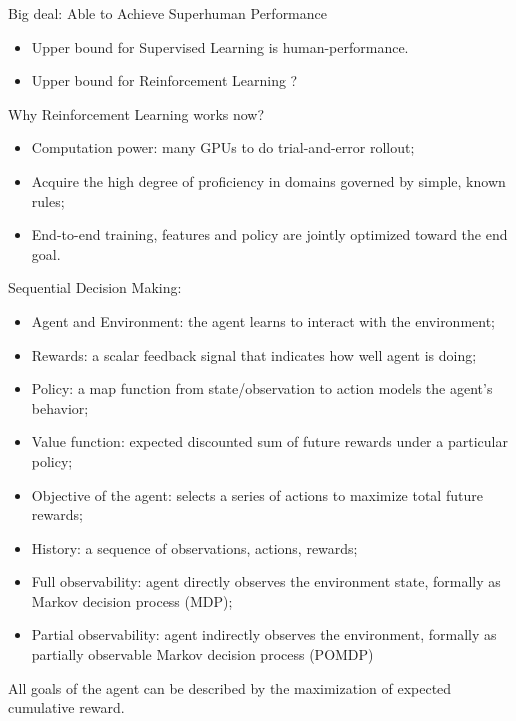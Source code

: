 \documentclass{progartcn}
\begin{document}
	Big deal: Able to Achieve Superhuman Performance
	\begin{itemize}[noitemsep,topsep=0pt]
		\item Upper bound for Supervised Learning is human-performance. 
		\item Upper bound for Reinforcement Learning ?\\
	\end{itemize}

	Why Reinforcement Learning works now?
	\begin{itemize}[noitemsep,topsep=0pt]
		\item Computation power: many GPUs to do trial-and-error rollout;
		\item Acquire the high degree of proficiency in domains governed by simple, known rules;
		\item End-to-end training, features and policy are jointly optimized toward the end goal.\\
	\end{itemize}

	Sequential Decision Making:
	\begin{itemize}[noitemsep,topsep=0pt]
		\item Agent and Environment: the agent learns to interact with the environment;
		\item Rewards: a scalar feedback signal that indicates how well agent is doing;
		\item Policy: a map function from state/observation to action models the agent’s behavior;
		\item Value function: expected discounted sum of future rewards under a particular policy;
		\item Objective of the agent: selects a series of actions to maximize total future rewards;
		\item History: a sequence of observations, actions, rewards;
		\item Full observability: agent directly observes the environment state, formally as Markov decision process (MDP);
		\item Partial observability: agent indirectly observes the environment, formally as partially observable Markov decision process (POMDP)
	\end{itemize}

	All goals of the agent can be described by the maximization of expected cumulative reward.\\
\end{document}
